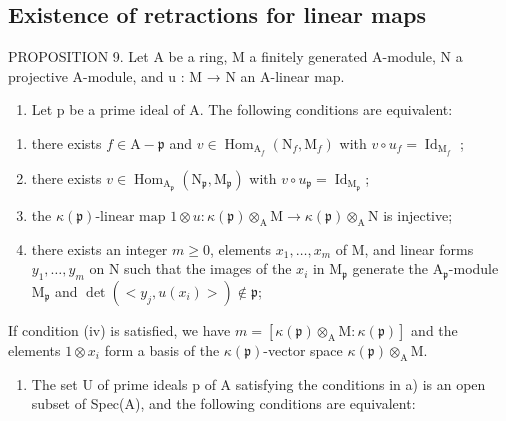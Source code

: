 \subsection{Existence of retractions for linear maps}

PROPOSITION 9. Let A be a ring, M a finitely generated A-module, N a projective A-module, and u : M → N an A-linear map.

\begin{enumerate}
\def\labelenumi{\alph{enumi})}
\tightlist
\item
  Let p be a prime ideal of A. The following conditions are equivalent:
\end{enumerate}

\begin{enumerate}
\def\labelenumi{(\roman{enumi})}
\item
  there exists \(f \in \mathrm{A} - \mathfrak{p}\) and \(v \in \operatorname{Hom}_{\mathrm{A}_f}(\mathrm{N}_f, \mathrm{M}_f)\) with \(v \circ u_f = \operatorname{Id}_{\mathrm{M}_f}\) ;
\item
  there exists \(v \in \operatorname{Hom}_{\mathrm{A}_{\mathfrak{p}}}(\mathrm{N}_{\mathfrak{p}}, \mathrm{M}_{\mathfrak{p}})\) with \(v \circ u_{\mathfrak{p}} = \operatorname{Id}_{\mathrm{M}_{\mathfrak{p}}}\);
\item
  the \(\kappa(\mathfrak{p})\text{-linear map }1 \otimes u : \kappa(\mathfrak{p}) \otimes_{\mathrm{A}} \mathrm{M} \to \kappa(\mathfrak{p}) \otimes_{\mathrm{A}} \mathrm{N}\) is injective;
\item
  there exists an integer \(m \geqslant 0\), elements \(x_{1}, \ldots, x_{m}\) of M, and linear forms \(y_{1}, \ldots, y_{m}\) on N such that the images of the \(x_{i}\) in \(\mathrm{M}_{\mathfrak{p}}\) generate the \(\mathrm{A}_{\mathfrak{p}}\)-module \(\mathrm{M}_{\mathfrak{p}}\) and \(\det(<y_{j}, u(x_{i})>) \notin \mathfrak{p}\);
\end{enumerate}

If condition (iv) is satisfied, we have \(m = [\kappa(\mathfrak{p}) \otimes_{\mathrm{A}} \mathrm{M} : \kappa(\mathfrak{p})]\) and the elements \(1 \otimes x_i\) form a basis of the \(\kappa(\mathfrak{p})\)-vector space \(\kappa(\mathfrak{p}) \otimes_{\mathrm{A}} \mathrm{M}\).

\begin{enumerate}
\def\labelenumi{\alph{enumi})}
\setcounter{enumi}{1}
\tightlist
\item
  The set U of prime ideals p of A satisfying the conditions in a) is an open subset of Spec(A), and the following conditions are equivalent:
\end{enumerate}

